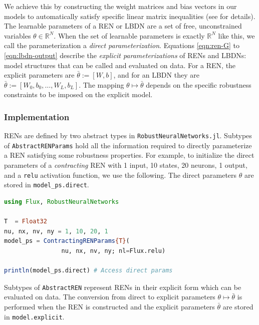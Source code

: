 We achieve this by constructing the weight matrices and bias vectors in our models to automatically satisfy specific linear matrix inequalities (see \cite{Revay++2021b} for details). The learnable parameters of a REN or LBDN are a set of free, unconstrained variables $\theta \in \mathbb{R}^N$. When the set of learnable parameters is exactly $\mathbb{R}^N$ like this, we call the parameterization a \textit{direct parameterization}. Equations \ref{eqn:ren-G} to \ref{eqn:lbdn-output} describe the \textit{explicit parameterizations} of RENs and LBDNs: model structures that can be called and evaluated on data. For a REN, the explicit parameters are $\bar{\theta} := [W, b]$, and for an LBDN they are $\bar{\theta} := [W_0, b_0, \ldots, W_L, b_L]$. The mapping $\theta \mapsto \bar{\theta}$ depends on the specific robustness constraints to be imposed on the explicit model. 

\subsubsection{Implementation} \label{sec:params-implementation}
RENs are defined by two abstract types in \verb|RobustNeuralNetworks.jl|. Subtypes of \verb|AbstractRENParams| hold all the information required to directly parameterize a REN satisfying some robustness properties. For example, to initialize the direct parameters of a \textit{contracting} REN with 1 input, 10 states, 20 neurons, 1 output, and a \texttt{relu} activation function, we use the following. The direct parameters $\theta$ are stored in \verb|model_ps.direct|. 

\begin{lstlisting}[language = Julia]
using Flux, RobustNeuralNetworks

T  = Float32
nu, nx, nv, ny = 1, 10, 20, 1
model_ps = ContractingRENParams{T}(
                nu, nx, nv, ny; nl=Flux.relu)
                
println(model_ps.direct) # Access direct params
\end{lstlisting}

Subtypes of \verb|AbstractREN| represent RENs in their explicit form which can be evaluated on data. The conversion from direct to explicit parameters $\theta \mapsto \bar{\theta}$ is performed when the REN is constructed and the explicit parameters $\bar{\theta}$ are stored in \verb|model.explicit|.


